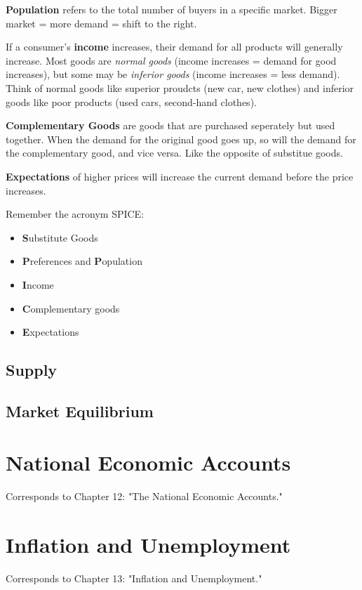 \documentclass[12pt, a4paper]{article}
\theoremstyle{definition}
\begin{document}
\textbf{Population} refers to the total number of buyers in a specific market.
Bigger market = more demand = shift to the right.

If a consumer's \textbf{income} increases, their demand for all products will generally increase.
Most goods are \textit{normal goods} (income increases = demand for good increases), but some may be \textit{inferior goods} (income increases = less demand).
Think of normal goods like superior proudcts (new car, new clothes) and inferior goods like poor products (used cars, second-hand clothes).

\textbf{Complementary Goods} are goods that are purchased seperately but used together.
When the demand for the original good goes up, so will the demand for the complementary good, and vice versa.
Like the opposite of substitue goods.

\textbf{Expectations} of higher prices will increase the current demand before the price increases.

Remember the acronym SPICE:
\begin{itemize}
    \item \textbf{S}ubstitute Goods
    \item \textbf{P}references and \textbf{P}opulation
    \item \textbf{I}ncome
    \item \textbf{C}omplementary goods
    \item \textbf{E}xpectations
\end{itemize}


\subsection{Supply}

\subsection{Market Equilibrium}

\newpage

\section{National Economic Accounts}
Corresponds to Chapter 12: "The National Economic Accounts."

\newpage

\section{Inflation and Unemployment}
Corresponds to Chapter 13: "Inflation and Unemployment."
\end{document}
